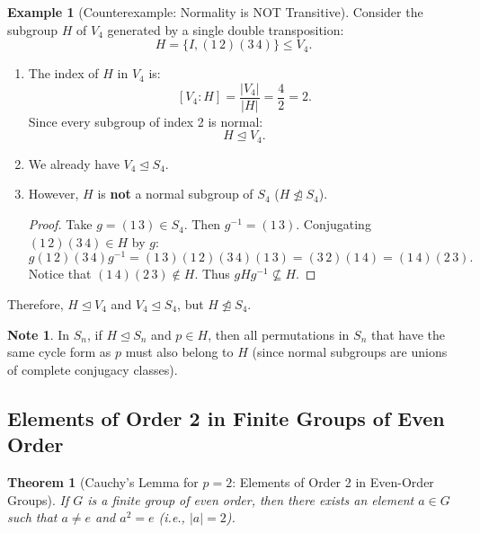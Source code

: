 \documentclass[12pt]{article}
\theoremstyle{definition}
\newtheorem{example}[definition]{Example}
\newtheorem*{note}{Note}
\theoremstyle{plain}
\newtheorem{theorem}{Theorem}[section]
\begin{document}
\begin{example}[Counterexample: Normality is NOT Transitive]
Consider the subgroup $H$ of $V_4$ generated by a single double transposition:
\[
H = \{ I, (1\,2)(3\,4) \} \le V_4.
\]
\begin{enumerate}
    \item The index of $H$ in $V_4$ is:
    \[
    [V_4 : H] = \frac{|V_4|}{|H|} = \frac{4}{2} = 2.
    \]
    Since every subgroup of index 2 is normal:
    \[
    H \trianglelefteq V_4.
    \]
    \item We already have $V_4 \trianglelefteq S_4$.
    \item However, $H$ is \textbf{not} a normal subgroup of $S_4$ ($H \not\trianglelefteq S_4$).
    \begin{proof}
    Take $g = (1\,3) \in S_4$. Then $g^{-1} = (1\,3)$. Conjugating $(1\,2)(3\,4) \in H$ by $g$:
    \[
    g (1\,2)(3\,4) g^{-1} = (1\,3)(1\,2)(3\,4)(1\,3) = (3\,2)(1\,4) = (1\,4)(2\,3).
    \]
    Notice that $(1\,4)(2\,3) \notin H$. Thus $g H g^{-1} \not\subseteq H$.
    \end{proof}
\end{enumerate}
Therefore, $H \trianglelefteq V_4$ and $V_4 \trianglelefteq S_4$, but $H \not\trianglelefteq S_4$.
\end{example}

\begin{note}
In $S_n$, if $H \trianglelefteq S_n$ and $p \in H$, then all permutations in $S_n$ that have the same cycle form as $p$ must also belong to $H$ (since normal subgroups are unions of complete conjugacy classes).
\end{note}

\subsection{Elements of Order 2 in Finite Groups of Even Order}

\begin{theorem}[Cauchy's Lemma for $p = 2$: Elements of Order 2 in Even-Order Groups]
If $G$ is a finite group of even order, then there exists an element $a \in G$ such that $a \neq e$ and $a^2 = e$ (i.e., $|a| = 2$).
\end{theorem}
\end{document}
